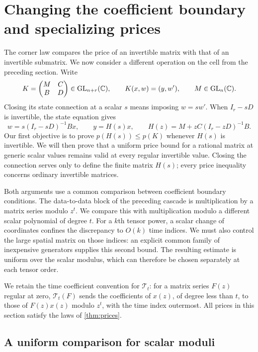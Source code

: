 \section{Changing the coefficient boundary and specializing prices}
\label{feedback:sec}

The corner law compares the price of an invertible matrix with that
of an invertible submatrix. We now consider a different operation on
the cell from the preceding section. Write
\[
 K=\begin{pmatrix}M&C\\B&D\end{pmatrix}\in\operatorname{GL}_{n+r}(\mathbb C),\qquad
 K(x,w)=(y,w'),\qquad M\in\operatorname{GL}_n(\mathbb C).
\]
Closing its state connection at a scalar $s$ means imposing $w=sw'$.
When $I_r-sD$ is invertible, the state equation gives
\[
 w=s(I_r-sD)^{-1}Bx,\qquad
 y=H(s)x,\qquad H(z)=M+zC(I_r-zD)^{-1}B.
\]
Our first objective is to prove $p(H(s))\le p(K)$ whenever $H(s)$
is invertible. We will then prove that a uniform
price bound for a rational matrix at generic scalar values remains
valid at every regular invertible value. Closing the connection serves
only to define the finite matrix $H(s)$; every price inequality concerns
ordinary invertible matrices.

Both arguments use a common comparison between coefficient boundary
conditions. The data-to-data block of the preceding cascade is multiplication
by a matrix series modulo $z^t$. We compare this with multiplication
modulo a different scalar polynomial of degree $t$. For a $k$th tensor
power, a scalar change of coordinates confines the discrepancy to
$O(k)$ time indices. We must also control the large spatial matrix on
those indices: an explicit common family of inexpensive generators
supplies this second bound. The resulting estimate is uniform over the
scalar modulus, which can therefore be chosen separately at each tensor
order.

We retain the time coefficient convention for $\mathcal T_t$: for a
matrix series $F(z)$ regular at zero, $\mathcal T_t(F)$ sends the
coefficients of $x(z)$, of degree less than $t$, to those of $F(z)x(z)$
modulo $z^t$, with the time index outermost. All prices in this section
satisfy the laws of \cref{thm:prices}.

\subsection{A uniform comparison for scalar moduli}

